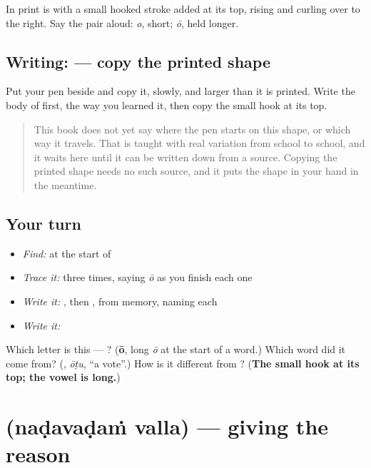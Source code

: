 In print \textbf{} is \textbf{} with a small hooked stroke added at its top, rising and curling over to the right. Say the pair aloud: \textbf{} \emph{o}, short; \textbf{} \emph{ō}, held longer.

\subsection*{Writing:  — copy the printed shape}
Put your pen beside \textbf{} and copy it, slowly, and larger than it is printed. Write the body of \textbf{} first, the way you learned it, then copy the small hook at its top.

\begin{quote}
This book does not yet say where the pen starts on this shape, or which way it travels. That is taught with real variation from school to school, and it waits here until it can be written down from a source. Copying the printed shape needs no such source, and it puts the shape in your hand in the meantime.
\end{quote}

\subsection*{Your turn}
\begin{itemize}
\raggedright
  \item \emph{Find:}  at the start of \textbf{}
  \item \emph{Trace it:}  three times, saying \emph{ō} as you finish each one
  \item \emph{Write it:} , then , from memory, naming each
  \item \emph{Write it:} \textbf{}
\end{itemize}

\begin{tcolorbox}[breakable,colback=teal!4,colframe=teal!35!black,title={Before you move on}]
Which letter is this — ? (\textbf{ō}, long \emph{ō} at the start of a word.) Which word did it come from? (\textbf{}, \emph{ōṭu}, \textquotedblleft{}a vote\textquotedblright{}.) How is it different from \textbf{}? (\textbf{The small hook at its top; the vowel is long.})
\end{tcolorbox}
\section[\texorpdfstring{\te{నడవడం} \te{వల్ల} (naḍavaḍaṁ valla)}{నడవడం వల్ల (naḍavaḍaṁ valla)}]{  (naḍavaḍaṁ valla) — giving the reason}


